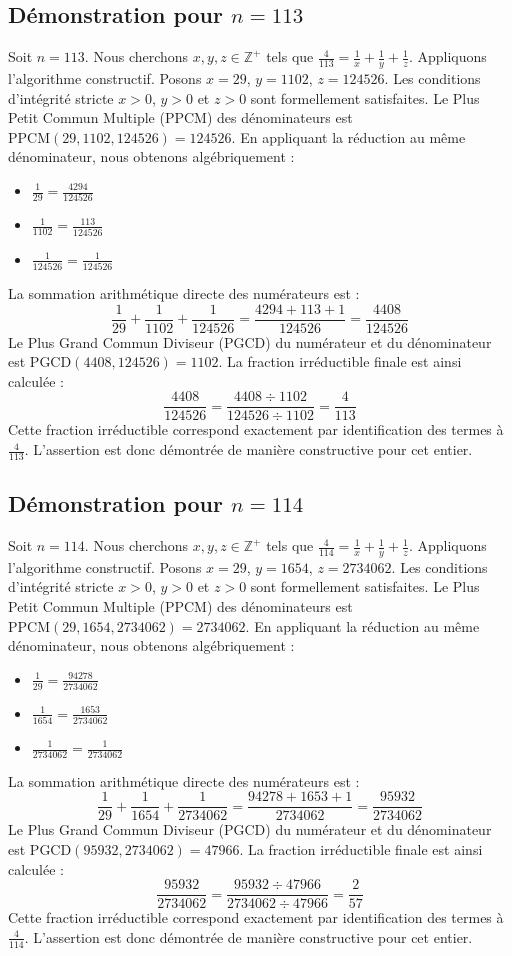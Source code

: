 \documentclass[11pt,a4paper]{article}
\begin{document}
\subsection{Démonstration pour $n = 113$}
Soit $n = 113$. Nous cherchons $x, y, z \in \mathbb{Z}^{+}$ tels que $\frac{4}{113} = \frac{1}{x} + \frac{1}{y} + \frac{1}{z}$.
Appliquons l'algorithme constructif. Posons $x = 29$, $y = 1102$, $z = 124526$.
Les conditions d'intégrité stricte $x > 0$, $y > 0$ et $z > 0$ sont formellement satisfaites.
Le Plus Petit Commun Multiple (PPCM) des dénominateurs est $\text{PPCM}(29, 1102, 124526) = 124526$.
En appliquant la réduction au même dénominateur, nous obtenons algébriquement :
\begin{itemize}
    \item $\frac{1}{29} = \frac{4294}{124526}$
    \item $\frac{1}{1102} = \frac{113}{124526}$
    \item $\frac{1}{124526} = \frac{1}{124526}$
\end{itemize}
La sommation arithmétique directe des numérateurs est :
$$ \frac{1}{29} + \frac{1}{1102} + \frac{1}{124526} = \frac{4294 + 113 + 1}{124526} = \frac{4408}{124526} $$
Le Plus Grand Commun Diviseur (PGCD) du numérateur et du dénominateur est $\text{PGCD}(4408, 124526) = 1102$.
La fraction irréductible finale est ainsi calculée :
$$ \frac{4408}{124526} = \frac{4408 \div 1102}{124526 \div 1102} = \frac{4}{113} $$
Cette fraction irréductible correspond exactement par identification des termes à $\frac{4}{113}$. L'assertion est donc démontrée de manière constructive pour cet entier.

\subsection{Démonstration pour $n = 114$}
Soit $n = 114$. Nous cherchons $x, y, z \in \mathbb{Z}^{+}$ tels que $\frac{4}{114} = \frac{1}{x} + \frac{1}{y} + \frac{1}{z}$.
Appliquons l'algorithme constructif. Posons $x = 29$, $y = 1654$, $z = 2734062$.
Les conditions d'intégrité stricte $x > 0$, $y > 0$ et $z > 0$ sont formellement satisfaites.
Le Plus Petit Commun Multiple (PPCM) des dénominateurs est $\text{PPCM}(29, 1654, 2734062) = 2734062$.
En appliquant la réduction au même dénominateur, nous obtenons algébriquement :
\begin{itemize}
    \item $\frac{1}{29} = \frac{94278}{2734062}$
    \item $\frac{1}{1654} = \frac{1653}{2734062}$
    \item $\frac{1}{2734062} = \frac{1}{2734062}$
\end{itemize}
La sommation arithmétique directe des numérateurs est :
$$ \frac{1}{29} + \frac{1}{1654} + \frac{1}{2734062} = \frac{94278 + 1653 + 1}{2734062} = \frac{95932}{2734062} $$
Le Plus Grand Commun Diviseur (PGCD) du numérateur et du dénominateur est $\text{PGCD}(95932, 2734062) = 47966$.
La fraction irréductible finale est ainsi calculée :
$$ \frac{95932}{2734062} = \frac{95932 \div 47966}{2734062 \div 47966} = \frac{2}{57} $$
Cette fraction irréductible correspond exactement par identification des termes à $\frac{4}{114}$. L'assertion est donc démontrée de manière constructive pour cet entier.
\end{document}
